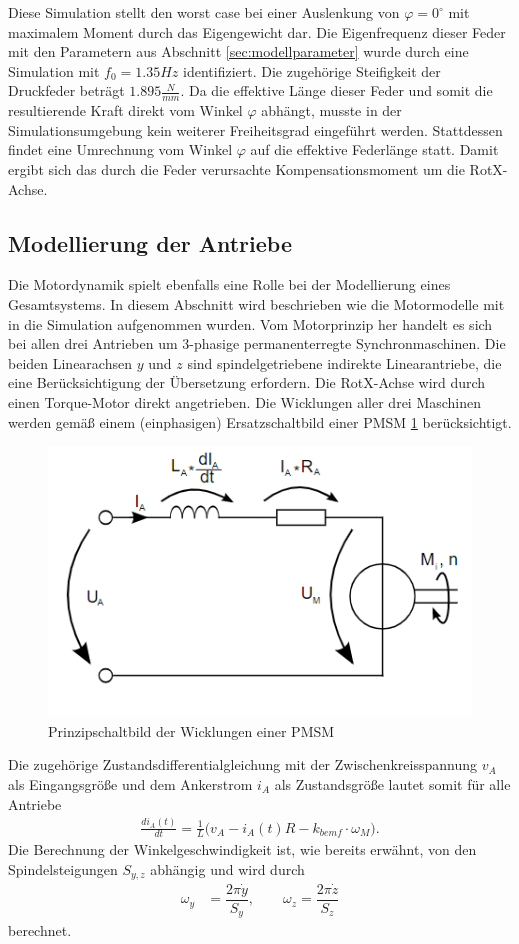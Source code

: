 \documentclass[10pt,a4paper]{iace.report}
\begin{document}
			Diese Simulation stellt den \glqq worst case\grqq\text{ } bei einer Auslenkung von $ \varphi=0^{\circ} $ mit maximalem Moment durch das Eigengewicht dar.
			Die Eigenfrequenz dieser Feder mit den Parametern aus Abschnitt \ref{sec:modellparameter} wurde durch eine Simulation mit $ f_{0} = 1.35Hz $ identifiziert. Die zugehörige Steifigkeit der Druckfeder beträgt $ 1.895 \frac{N}{mm} $. Da die effektive Länge dieser Feder und somit die resultierende Kraft direkt vom Winkel $ \varphi $ abhängt, musste in der Simulationsumgebung kein weiterer Freiheitsgrad eingeführt werden. Stattdessen findet eine Umrechnung vom Winkel $ \varphi $ auf die effektive Federlänge statt. Damit ergibt sich das durch die Feder verursachte Kompensationsmoment um die RotX-Achse.
			
		\subsection{Modellierung der Antriebe}
			Die Motordynamik spielt ebenfalls eine Rolle bei der Modellierung eines Gesamtsystems. In diesem Abschnitt wird beschrieben wie die Motormodelle mit in die Simulation aufgenommen wurden. Vom Motorprinzip her handelt es sich bei allen drei Antrieben um 3-phasige permanenterregte Synchronmaschinen. Die beiden Linearachsen $ y $ und $ z $ sind spindelgetriebene indirekte Linearantriebe, die eine Berücksichtigung der Übersetzung erfordern. Die RotX-Achse wird durch einen Torque-Motor direkt angetrieben. Die Wicklungen aller drei Maschinen werden gemäß einem (einphasigen) Ersatzschaltbild einer PMSM \ref{fig:pmsm} berücksichtigt.  
			\begin{figure}[!h]
				\centering
				\includegraphics[width=0.4\linewidth]{./pics/pmsm.png}
				\caption{Prinzipschaltbild der Wicklungen einer PMSM}
				\label{fig:pmsm}
			\end{figure}
			Die zugehörige Zustandsdifferentialgleichung mit der Zwischenkreisspannung $ v_{A} $ als Eingangsgröße und dem Ankerstrom $ i_{A} $ als Zustandsgröße lautet somit für alle Antriebe
			\begin{align*}
				\frac{d i_{A}(t)}{dt} = \frac{1}{L}\bigg(v_{A}-i_{A}(t)R - k_{bemf}\cdot\omega_{M} \bigg).
			\end{align*}
			Die Berechnung der Winkelgeschwindigkeit ist, wie bereits erwähnt, von den Spindelsteigungen $ S_{y,z} $ abhängig und wird durch 
			\begin{align*}
				\omega_{y} &=\dfrac{ 2\pi \dot{y}}{S_{y}},  \qquad \omega_{z} =\dfrac{ 2\pi \dot{z}}{S_{z}}  
			\end{align*}
			berechnet.
			
\end{document}
